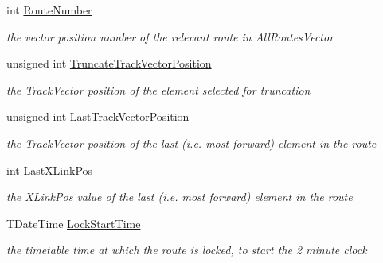 \begin{DoxyCompactItemize}
\item 
\mbox{\label{class_t_all_routes_1_1_t_locked_route_class_a2656289cb7f1553d6189a03dda77fe16}} 
int \mbox{\hyperlink{class_t_all_routes_1_1_t_locked_route_class_a2656289cb7f1553d6189a03dda77fe16}{Route\+Number}}
\begin{DoxyCompactList}\small\item\em the vector position number of the relevant route in All\+Routes\+Vector \end{DoxyCompactList}\item 
\mbox{\label{class_t_all_routes_1_1_t_locked_route_class_a225d5505b6ec121e35defa4f228798f5}} 
unsigned int \mbox{\hyperlink{class_t_all_routes_1_1_t_locked_route_class_a225d5505b6ec121e35defa4f228798f5}{Truncate\+Track\+Vector\+Position}}
\begin{DoxyCompactList}\small\item\em the Track\+Vector position of the element selected for truncation \end{DoxyCompactList}\item 
\mbox{\label{class_t_all_routes_1_1_t_locked_route_class_a9a989378c6e20fc0c68bbbebe87016c3}} 
unsigned int \mbox{\hyperlink{class_t_all_routes_1_1_t_locked_route_class_a9a989378c6e20fc0c68bbbebe87016c3}{Last\+Track\+Vector\+Position}}
\begin{DoxyCompactList}\small\item\em the Track\+Vector position of the last (i.\+e. most forward) element in the route \end{DoxyCompactList}\item 
\mbox{\label{class_t_all_routes_1_1_t_locked_route_class_acc5cb84f033b12d8216816b8a6a6c0a3}} 
int \mbox{\hyperlink{class_t_all_routes_1_1_t_locked_route_class_acc5cb84f033b12d8216816b8a6a6c0a3}{Last\+X\+Link\+Pos}}
\begin{DoxyCompactList}\small\item\em the X\+Link\+Pos value of the last (i.\+e. most forward) element in the route \end{DoxyCompactList}\item 
\mbox{\label{class_t_all_routes_1_1_t_locked_route_class_a387fd30893416bd59e9f8719282c4f26}} 
T\+Date\+Time \mbox{\hyperlink{class_t_all_routes_1_1_t_locked_route_class_a387fd30893416bd59e9f8719282c4f26}{Lock\+Start\+Time}}
\begin{DoxyCompactList}\small\item\em the timetable time at which the route is locked, to start the 2 minute clock \end{DoxyCompactList}\end{DoxyCompactItemize}



